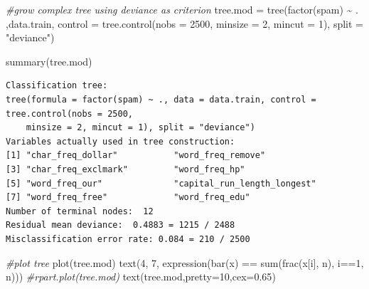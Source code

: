 \documentclass[
  11pt,
]{article}
\newenvironment{Shaded}{\begin{snugshade}}{\end{snugshade}}
\newcommand{\AttributeTok}[1]{\textcolor[rgb]{0.77,0.63,0.00}{#1}}
\newcommand{\CommentTok}[1]{\textcolor[rgb]{0.56,0.35,0.01}{\textit{#1}}}
\newcommand{\DecValTok}[1]{\textcolor[rgb]{0.00,0.00,0.81}{#1}}
\newcommand{\FloatTok}[1]{\textcolor[rgb]{0.00,0.00,0.81}{#1}}
\newcommand{\FunctionTok}[1]{\textcolor[rgb]{0.00,0.00,0.00}{#1}}
\newcommand{\NormalTok}[1]{#1}
\newcommand{\OtherTok}[1]{\textcolor[rgb]{0.56,0.35,0.01}{#1}}
\newcommand{\SpecialCharTok}[1]{\textcolor[rgb]{0.00,0.00,0.00}{#1}}
\newcommand{\StringTok}[1]{\textcolor[rgb]{0.31,0.60,0.02}{#1}}
\begin{document}
\begin{Shaded}
\begin{Highlighting}[]
\CommentTok{\#grow complex tree using deviance as criterion}
\NormalTok{tree.mod }\OtherTok{=} \FunctionTok{tree}\NormalTok{(}\FunctionTok{factor}\NormalTok{(spam) }\SpecialCharTok{\textasciitilde{}}\NormalTok{ . ,data.train, }
                \AttributeTok{control =} \FunctionTok{tree.control}\NormalTok{(}\AttributeTok{nobs =} \DecValTok{2500}\NormalTok{, }\AttributeTok{minsize =} \DecValTok{2}\NormalTok{, }\AttributeTok{mincut =} \DecValTok{1}\NormalTok{),}
                \AttributeTok{split =} \StringTok{"deviance"}\NormalTok{)}

\FunctionTok{summary}\NormalTok{(tree.mod)}
\end{Highlighting}
\end{Shaded}

\begin{verbatim}
Classification tree:
tree(formula = factor(spam) ~ ., data = data.train, control = tree.control(nobs = 2500, 
    minsize = 2, mincut = 1), split = "deviance")
Variables actually used in tree construction:
[1] "char_freq_dollar"           "word_freq_remove"          
[3] "char_freq_exclmark"         "word_freq_hp"              
[5] "word_freq_our"              "capital_run_length_longest"
[7] "word_freq_free"             "word_freq_edu"             
Number of terminal nodes:  12 
Residual mean deviance:  0.4883 = 1215 / 2488 
Misclassification error rate: 0.084 = 210 / 2500 
\end{verbatim}

\begin{Shaded}
\begin{Highlighting}[]
\CommentTok{\#plot tree}
\FunctionTok{plot}\NormalTok{(tree.mod)}
\FunctionTok{text}\NormalTok{(}\DecValTok{4}\NormalTok{, }\DecValTok{7}\NormalTok{, }\FunctionTok{expression}\NormalTok{(}\FunctionTok{bar}\NormalTok{(x) }\SpecialCharTok{==} \FunctionTok{sum}\NormalTok{(}\FunctionTok{frac}\NormalTok{(x[i], n), i}\SpecialCharTok{==}\DecValTok{1}\NormalTok{, n)))}
\CommentTok{\#rpart.plot(tree.mod)}
\FunctionTok{text}\NormalTok{(tree.mod,}\AttributeTok{pretty=}\DecValTok{10}\NormalTok{,}\AttributeTok{cex=}\FloatTok{0.65}\NormalTok{)}
\end{Highlighting}
\end{Shaded}
\end{document}
